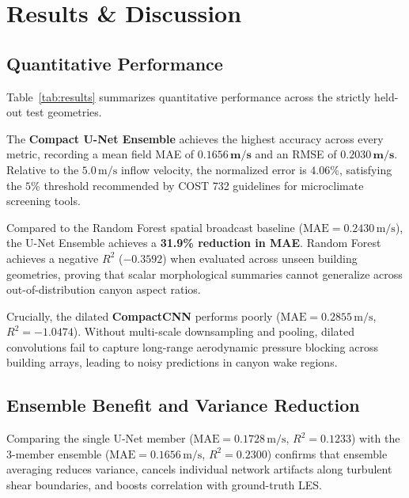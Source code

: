 \documentclass[10pt,twocolumn]{article}
\begin{document}
\section{Results & Discussion}
\subsection{Quantitative Performance}
Table~\ref{tab:results} summarizes quantitative performance across the strictly held-out test geometries.

The \textbf{Compact U-Net Ensemble} achieves the highest accuracy across every metric, recording a mean field MAE of $\mathbf{0.1656\,\text{m/s}}$ and an RMSE of $\mathbf{0.2030\,\text{m/s}}$. Relative to the $5.0\,\text{m/s}$ inflow velocity, the normalized error is $\mathbf{4.06\%}$, satisfying the $5\%$ threshold recommended by COST 732 guidelines for microclimate screening tools.

Compared to the Random Forest spatial broadcast baseline ($\text{MAE} = 0.2430\,\text{m/s}$), the U-Net Ensemble achieves a \textbf{31.9\% reduction in MAE}. Random Forest achieves a negative $R^2$ ($-0.3592$) when evaluated across unseen building geometries, proving that scalar morphological summaries cannot generalize across out-of-distribution canyon aspect ratios.

Crucially, the dilated \textbf{CompactCNN} performs poorly ($\text{MAE} = 0.2855\,\text{m/s}$, $R^2 = -1.0474$). Without multi-scale downsampling and pooling, dilated convolutions fail to capture long-range aerodynamic pressure blocking across building arrays, leading to noisy predictions in canyon wake regions.

\subsection{Ensemble Benefit and Variance Reduction}
Comparing the single U-Net member ($\text{MAE} = 0.1728\,\text{m/s}$, $R^2 = 0.1233$) with the 3-member ensemble ($\text{MAE} = 0.1656\,\text{m/s}$, $R^2 = 0.2300$) confirms that ensemble averaging reduces variance, cancels individual network artifacts along turbulent shear boundaries, and boosts correlation with ground-truth LES.
\end{document}
